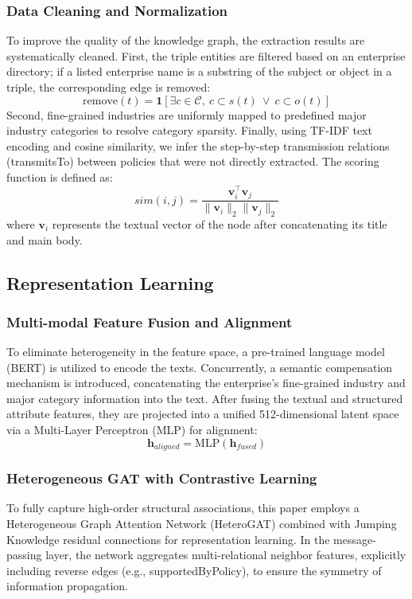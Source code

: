 \subsubsection{Data Cleaning and Normalization}
To improve the quality of the knowledge graph, the extraction results are systematically cleaned. First, the triple entities are filtered based on an enterprise directory; if a listed enterprise name is a substring of the subject or object in a triple, the corresponding edge is removed:
$$ \text{remove}(t)=\mathbf{1}\left[\exists c\in \mathcal{C},\ c\subset s(t)\ \lor\ c\subset o(t)\right] $$
Second, fine-grained industries are uniformly mapped to predefined major industry categories to resolve category sparsity. Finally, using TF-IDF text encoding and cosine similarity, we infer the step-by-step transmission relations (transmitsTo) between policies that were not directly extracted. The scoring function is defined as:
$$ sim(i,j)=\frac{\mathbf{v}_i^\top\mathbf{v}_j}{\|\mathbf{v}_i\|_2\|\mathbf{v}_j\|_2} $$
where $\mathbf{v}_i$ represents the textual vector of the node after concatenating its title and main body.

\subsection{Representation Learning}

\subsubsection{Multi-modal Feature Fusion and Alignment}
To eliminate heterogeneity in the feature space, a pre-trained language model (BERT) is utilized to encode the texts. Concurrently, a semantic compensation mechanism is introduced, concatenating the enterprise's fine-grained industry and major category information into the text. After fusing the textual and structured attribute features, they are projected into a unified 512-dimensional latent space via a Multi-Layer Perceptron (MLP) for alignment:
$$ \mathbf{h}_{aligned}=\mathrm{MLP}(\mathbf{h}_{fused}) $$

\subsubsection{Heterogeneous GAT with Contrastive Learning}
To fully capture high-order structural associations, this paper employs a Heterogeneous Graph Attention Network (HeteroGAT) combined with Jumping Knowledge residual connections for representation learning. In the message-passing layer, the network aggregates multi-relational neighbor features, explicitly including reverse edges (e.g., supportedByPolicy), to ensure the symmetry of information propagation.

